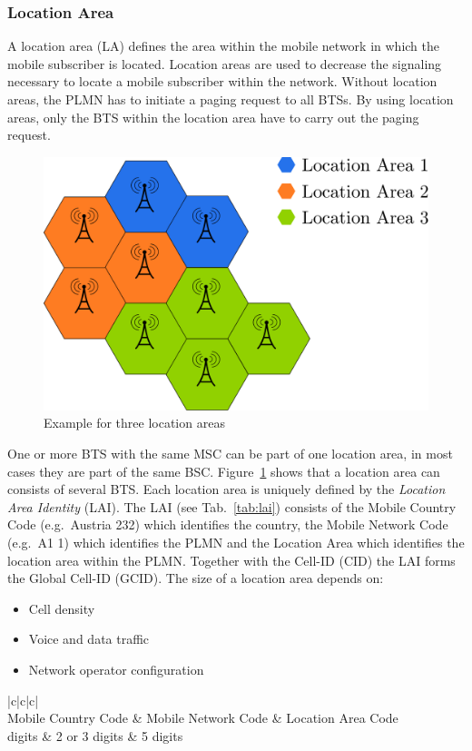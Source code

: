 \documentclass[master,english]{hgbthesis}
\begin{document}
\subsubsection{Location Area}
A location area (LA) defines the area within the mobile network in which the mobile subscriber is located. Location areas are used to decrease the signaling necessary to locate a mobile subscriber within the network. Without location areas, the PLMN has to initiate a paging request to all BTSs. By using location areas, only the BTS within the location area have to carry out the paging request.
%
\begin{figure}
	\centering
	\includegraphics[width=0.7\linewidth]{./images/locationarea}
	\caption{Example for three location areas}
	\label{fig:locationarea}
\end{figure}
One or more BTS with the same MSC can be part of one location area, in most cases they are part of the same BSC. Figure~\ref{fig:locationarea} shows that a location area can consists of several BTS. Each location area is uniquely defined by the \emph{Location Area Identity} (LAI). The LAI (see Tab.\ \ref{tab:lai}) consists of the Mobile Country Code (e.g.\ Austria 232) which identifies the country, the Mobile Network Code (e.g.\ A1 1) which identifies the PLMN and the Location Area which identifies the location area within the PLMN. Together with the Cell-ID (CID) the LAI forms the Global Cell-ID (GCID).
The size of a location area depends on:
\begin{itemize}
	\item Cell density
	\item Voice and data traffic
	\item Network operator configuration
\end{itemize}
\begin{table}
	\begin{tabular}{|c|c|c|}
		\hline  {} \\
		\hline Mobile Country Code & Mobile Network Code & Location Area Code \\
		 digits            & 2 or 3 digits       & 5 digits           \\
		\hline
	\end{tabular}
	\caption{Parts of the Location Area Identity }
	\label{tab:lai}
\end{table}
\end{document}

